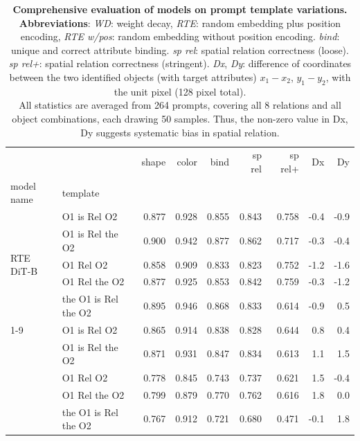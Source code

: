 \begin{table}[p]
    \centering
        \caption{\textbf{Comprehensive evaluation of models on prompt template variations.} \\
         \textbf{Abbreviations}: \textit{WD}: weight decay, \textit{RTE}: random embedding plus position encoding, \textit{RTE w/pos}: random embedding without position encoding. \textit{bind}: unique and correct attribute binding. \textit{sp rel}: spatial relation correctness (loose). \textit{sp rel+}: spatial relation correctness (stringent). \textit{Dx}, \textit{Dy}: difference of coordinates between the two identified objects (with target attributes) $x_1-x_2$, $y_1-y_2$, with the unit pixel (128 pixel total).  \\
         All statistics are averaged from 264 prompts, covering all 8 relations and all object combinations, each drawing 50 samples.
         Thus, the non-zero value in Dx, Dy suggests systematic bias in spatial relation. }
    \label{tab:model_cmp_eval_table}
    \scriptsize
    \renewcommand{\arraystretch}{0.88}
    \setlength{\tabcolsep}{4pt}
    \begin{tabular}{llrrrrrrr}
\toprule
 &  & shape & color & bind & sp rel & sp rel+ & Dx & Dy \\
model name & template &  &  &  &  &  &  &  \\
\midrule
\multirow[t]{5}{*}{RTE DiT-B} & O1 is Rel O2 & 0.877 & 0.928 & 0.855 & 0.843 & 0.758 & -0.4 & -0.9 \\
 & O1 is Rel the O2 & 0.900 & 0.942 & 0.877 & 0.862 & 0.717 & -0.3 & -0.4 \\
 & O1 Rel O2 & 0.858 & 0.909 & 0.833 & 0.823 & 0.752 & -1.2 & -1.6 \\
 & O1 Rel the O2 & 0.877 & 0.925 & 0.853 & 0.842 & 0.759 & -0.3 & -1.2 \\
 & the O1 is Rel the O2 & 0.895 & 0.946 & 0.868 & 0.833 & 0.614 & -0.9 & 0.5 \\
\cline{1-9}
\multirow[t]{5}{*}{RTE DiT-mini} & O1 is Rel O2 & 0.865 & 0.914 & 0.838 & 0.828 & 0.644 & 0.8 & 0.4 \\
 & O1 is Rel the O2 & 0.871 & 0.931 & 0.847 & 0.834 & 0.613 & 1.1 & 1.5 \\
 & O1 Rel O2 & 0.778 & 0.845 & 0.743 & 0.737 & 0.621 & 1.5 & -0.4 \\
 & O1 Rel the O2 & 0.799 & 0.879 & 0.770 & 0.762 & 0.616 & 1.8 & 0.0 \\
 & the O1 is Rel the O2 & 0.767 & 0.912 & 0.721 & 0.680 & 0.471 & -0.1 & 1.8 \\

\end{tabular}
\end{table}
